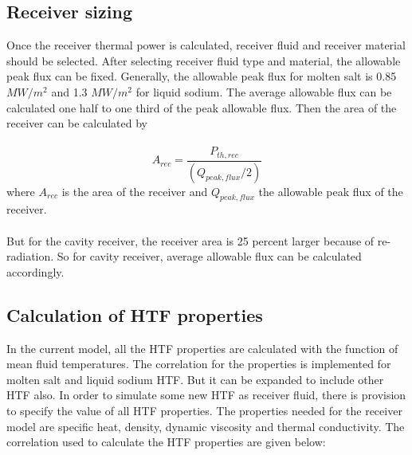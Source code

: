 \subsection{Receiver sizing}
Once the receiver thermal power is calculated, receiver fluid and receiver material should be selected. After selecting receiver fluid type and material, the allowable peak flux can be fixed. Generally, the allowable peak flux for molten salt is 0.85 $MW/m^2$ and 1.3 $MW/m^2$ for liquid sodium. The average allowable flux can be calculated one half to one third of the peak allowable flux. Then the area of the receiver can be calculated by \\\\
\begin{equation}
	A_{rec} = \frac {P_{th,rec}} {(Q_{peak,flux} /2)}
\end{equation}
where $A_{rec}$ is the area of the receiver and $Q_{peak,flux}$ the allowable peak flux of the receiver.\\\\
But for the cavity receiver, the receiver area is 25 percent\cite{Falcone.1986} larger because of re-radiation. So for cavity receiver, average allowable flux can be calculated accordingly.
\subsection{Calculation of HTF properties}
In the current model, all the HTF properties are calculated with the function of mean fluid temperatures. The correlation for the properties is implemented for molten salt and liquid sodium HTF. But it can be expanded to include other HTF also. In order to simulate some new HTF as receiver fluid, there is provision to specify the value of all HTF properties. The properties needed for the receiver model are specific heat, density, dynamic viscosity and thermal conductivity. The correlation used to calculate the HTF properties are given below:\\\\
